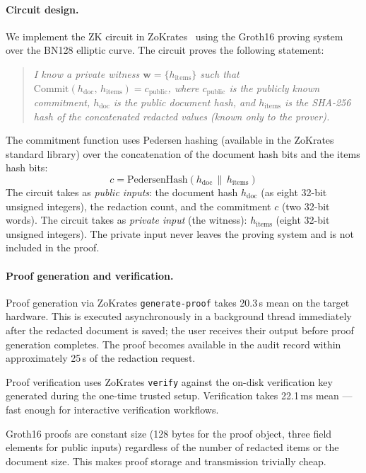 \documentclass[conference]{IEEEtran}
\begin{document}
\paragraph{Circuit design.}
We implement the ZK circuit in ZoKrates~\cite{eberhardt2018zokrates}
using the Groth16 proving system over the
BN128 elliptic curve.
The circuit proves the following statement:

\begin{quote}
\textit{I know a private witness
$\mathbf{w} = \{h_{\text{items}}\}$ such that
$\text{Commit}(h_{\text{doc}},\, h_{\text{items}}) =
c_{\text{public}}$, where $c_{\text{public}}$ is the
publicly known commitment, $h_{\text{doc}}$ is the
public document hash, and $h_{\text{items}}$ is the
SHA-256 hash of the concatenated redacted values
(known only to the prover).}
\end{quote}

The commitment function uses Pedersen hashing
(available in the ZoKrates standard library) over
the concatenation of the document hash bits and
the items hash bits:
\begin{equation}
  c = \text{PedersenHash}(
        h_{\text{doc}} \,\|\, h_{\text{items}})
  \label{eq:commitment}
\end{equation}
The circuit takes as \emph{public inputs}:
the document hash $h_{\text{doc}}$ (as eight
32-bit unsigned integers), the redaction count,
and the commitment $c$ (two 32-bit words).
The circuit takes as \emph{private input}
(the witness): $h_{\text{items}}$ (eight 32-bit
unsigned integers).
The private input never leaves the proving system
and is not included in the proof.

\paragraph{Proof generation and verification.}
Proof generation via ZoKrates \texttt{generate-proof}
takes 20.3\,s mean on the target hardware.
This is executed asynchronously in a background
thread immediately after the redacted document is
saved; the user receives their output before proof
generation completes.
The proof becomes available in the audit record
within approximately 25\,s of the redaction request.

Proof verification uses ZoKrates \texttt{verify}
against the on-disk verification key generated
during the one-time trusted setup.
Verification takes 22.1\,ms mean ---
fast enough for interactive verification workflows.

Groth16 proofs are constant size (128 bytes for the
proof object, three field elements for public inputs)
regardless of the number of redacted items or the
document size.
This makes proof storage and transmission trivially
cheap.
\end{document}
